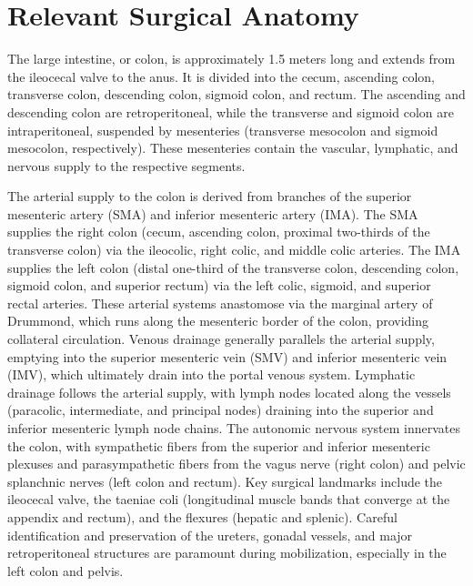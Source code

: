 \section*{Relevant Surgical Anatomy}
The large intestine, or colon, is approximately 1.5 meters long and extends from the ileocecal valve to the anus. It is divided into the cecum, ascending colon, transverse colon, descending colon, sigmoid colon, and rectum. The ascending and descending colon are retroperitoneal, while the transverse and sigmoid colon are intraperitoneal, suspended by mesenteries (transverse mesocolon and sigmoid mesocolon, respectively). These mesenteries contain the vascular, lymphatic, and nervous supply to the respective segments.

The arterial supply to the colon is derived from branches of the superior mesenteric artery (SMA) and inferior mesenteric artery (IMA). The SMA supplies the right colon (cecum, ascending colon, proximal two-thirds of the transverse colon) via the ileocolic, right colic, and middle colic arteries. The IMA supplies the left colon (distal one-third of the transverse colon, descending colon, sigmoid colon, and superior rectum) via the left colic, sigmoid, and superior rectal arteries. These arterial systems anastomose via the marginal artery of Drummond, which runs along the mesenteric border of the colon, providing collateral circulation. Venous drainage generally parallels the arterial supply, emptying into the superior mesenteric vein (SMV) and inferior mesenteric vein (IMV), which ultimately drain into the portal venous system. Lymphatic drainage follows the arterial supply, with lymph nodes located along the vessels (paracolic, intermediate, and principal nodes) draining into the superior and inferior mesenteric lymph node chains. The autonomic nervous system innervates the colon, with sympathetic fibers from the superior and inferior mesenteric plexuses and parasympathetic fibers from the vagus nerve (right colon) and pelvic splanchnic nerves (left colon and rectum). Key surgical landmarks include the ileocecal valve, the taeniae coli (longitudinal muscle bands that converge at the appendix and rectum), and the flexures (hepatic and splenic). Careful identification and preservation of the ureters, gonadal vessels, and major retroperitoneal structures are paramount during mobilization, especially in the left colon and pelvis.

